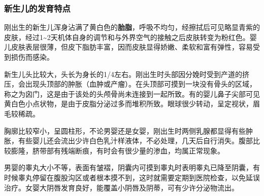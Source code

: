 \subsubsection{新生儿的发育特点}

刚出生的新生儿浑身沾满了黄白色的\textbf{胎脂}，呼吸不均匀，经擦拭后可见略显青紫的皮肤，经过1\textasciitilde2天机体自身的调节和与外界空气的接触之后皮肤转变为粉红色。婴儿皮肤表层很薄，但皮下脂肪丰富，因而皮肤显得娇嫩、柔软和富有弹性，容易受到损伤而感染。

新生儿头比较大，头长为身长的1/4左右。刚出生时头部因分娩时受到产道的挤压，会出现头顶部的肿胀（血肿或产瘤）。在头顶部可摸到一块没有骨头的区域，称之为囟门，这是由于该处的头颅骨尚未连接到一起所致。有的婴儿鼻子尖部可见黄白色小点状物，是由于皮脂分泌过多而堆积所致。眼球很少转动，呈定视状，眉毛较稀疏。

胸廓比较窄小，呈圆柱形，不论男婴还是女婴，刚出生时两侧乳腺都显得有些肿胀，有些婴儿还会流出少许白色乳汁样液体，不必处理，几天后自行消失。腹部比较膨隆，脐带部有残端断痕，有时会有很少量的渗血，均属正常现象。

男婴的睾丸大小不等，表面有皱褶，阴囊内可摸到睾丸时表明睾丸已降至阴囊，有时候睾丸停留在腹股沟区或者根本摸不到，这时就需要定期到医院检查，以免延误治疗。女婴大阴唇发育良好，能覆盖小阴唇及阴蒂，可有少许分泌物流出。


